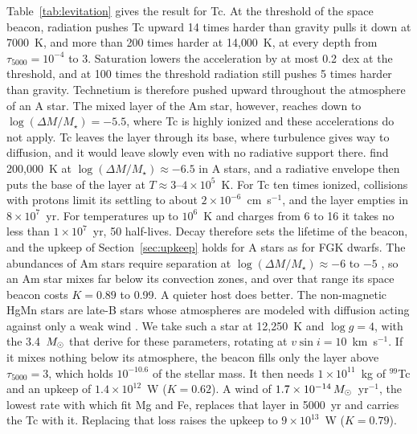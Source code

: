 \documentclass[final,5p]{elsarticle}
\begin{document}
Table~\ref{tab:levitation} gives the result for Tc. At the threshold of the  space beacon, radiation pushes Tc upward 14 times harder than gravity pulls it down at 7000~K, and more than 200 times harder at 14{,}000~K, at every depth from $\tau_{5000} = 10^{-4}$ to 3. Saturation lowers the acceleration by at most 0.2~dex at the threshold, and at 100 times the threshold radiation still pushes 5 times harder than gravity. Technetium is therefore pushed upward throughout the atmosphere of an A star. The mixed layer of the Am star, however, reaches down to $\log(\Delta M/M_\star) = -5.5$, where Tc is highly ionized and these accelerations do not apply. Tc leaves the layer through its base, where turbulence gives way to diffusion, and it would leave slowly even with no radiative support there. \citet{Richard2001} find 200{,}000~K at $\log(\Delta M/M_\star) \approx -6.5$ in A stars, and a radiative envelope then puts the base of the layer at $T \approx 3$--$4\times10^{5}$~K. For Tc ten times ionized, collisions with protons limit its settling to about $2\times10^{-6}$~cm~s$^{-1}$, and the layer empties in $8\times10^{7}$~yr. For temperatures up to $10^{6}$~K and charges from 6 to 16 it takes no less than $1\times10^{7}$~yr, 50 half-lives. Decay therefore sets the lifetime of the beacon, and the upkeep of Section~\ref{sec:upkeep} holds for A stars as for FGK dwarfs. The abundances of Am stars require separation at $\log(\Delta M/M_\star) \approx -6$ to $-5$ \citep{Vick2010}, so an Am star mixes far below its convection zones, and over that range its  space beacon costs $K = 0.89$ to 0.99. A quieter host does better. The non-magnetic HgMn stars are late-B stars whose atmospheres are modeled with diffusion acting against only a weak wind \citep{AlecianStift2019}. We take such a star at 12{,}250~K and $\log g = 4$, with the 3.4~$M_\odot$ that \citet{AlecianStift2019} derive for these parameters, rotating at $v\sin i = 10$~km~s$^{-1}$. If it mixes nothing below its atmosphere, the beacon fills only the layer above $\tau_{5000} = 3$, which holds $10^{-10.6}$ of the stellar mass. It then needs $1\times10^{11}$~kg of $^{99}$Tc and an upkeep of $1.4\times10^{12}$~W ($K = 0.62$). A wind of $1.7\times10^{-14}\,M_\odot$~yr$^{-1}$, the lowest rate with which \citet{AlecianStift2019} fit Mg and Fe, replaces that layer in 5000~yr and carries the Tc with it. Replacing that loss raises the upkeep to $9\times10^{13}$~W ($K = 0.79$).
\end{document}
